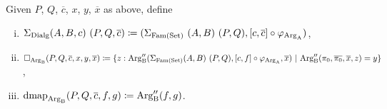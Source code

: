 \documentclass[orivec,envcountsame, ,envcountsect]{llncs}
\begin{document}
\begin{definition}
Given $P$, $Q$, $\overline{c}$, $x$, $y$, $\overline{x}$ as above, define
  \begin{enumerate}[(i)]
  \item $\Sigma_{\text{Dialg}} (A, B, c)\ (P, Q, \overline{c}) \coloneqq (\Sigma_{\text{Fam}(\text{Set})}\ (A,
    B)\ (P, Q), [c, \overline{c}] \circ \varphi_{\text{Arg}_{\text{A}}})$,
  \item $\Box_{\text{Arg}_{\text{B}}}(P, Q, \overline{c}, x, y, \overline{x}) \coloneqq \\
\{ z : \text{Arg}_{\text{B}}''(\Sigma_{\text{Fam}(\text{Set})} (A, B)\ (P, Q), [c, f] \circ \varphi_{\text{Arg}_{\text{A}}}, \overline{x}
)\ |\ \text{Arg}_{\text{B}}''(\pi_0, \overline{\pi_0}, \overline{x}, z) = y \}$,
\item $\text{dmap}_{\text{Arg}_{\text{B}}}(P, Q, \overline{c}, f, g) \coloneqq \text{Arg}_{\text{B}}''(f, g)$.
  \end{enumerate}
\end{definition}
\end{document}
